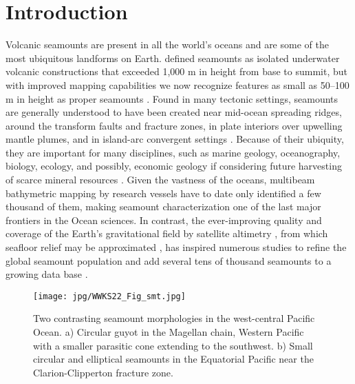 %

\section{Introduction}
Volcanic seamounts are present in all the world's oceans and are some of the most ubiquitous
landforms on Earth. \citet{M1964} defined seamounts as isolated underwater volcanic constructions
that exceeded 1,000 m in height from base to summit, but with improved mapping capabilities we now
recognize features as small as 50–100 m in height as proper seamounts \citep[e.g.,~][]{SC1990}.
Found in many tectonic settings, seamounts are generally understood to have been created near mid-ocean
spreading ridges, around the transform faults and fracture zones, in plate interiors over upwelling
mantle plumes, and in island-arc convergent settings
\citep[e.g.,~][]{SC2010}. Because of their ubiquity, they are important for many disciplines, such as
marine geology, oceanography, biology, ecology, and possibly, economic geology if considering future harvesting of
scarce mineral resources \citep[e.g.,~][]{WSK2010,WK2010}. Given the vastness of the oceans, multibeam bathymetric
mapping by research vessels have to date only identified a few thousand of them, making seamount
characterization one of the last major frontiers in the Ocean sciences. In contrast, the ever-improving
quality and coverage of the Earth's gravitational field by
satellite altimetry \citep[e.g.,~][]{Setal2021}, from which seafloor relief may be approximated
\citep{SS1997}, has inspired numerous studies to refine the global seamount population and add several
tens of thousand seamounts to a growing data base \citep{CS1988,WL1997,W2001,KL2004,KW2011,G2022}. 

\begin{figure}[h]
\centering
\noindent \texttt{[image: jpg/WWKS22\_Fig\_smt.jpg]}
\caption{Two contrasting seamount morphologies in the west-central Pacific Ocean. a) Circular guyot in the Magellan chain,
Western Pacific with a smaller parasitic cone extending to the southwest. b) Small circular and
elliptical seamounts in the Equatorial Pacific near the Clarion-Clipperton fracture zone.}
\label{WWKS22_Fig_sm}
\end{figure}

